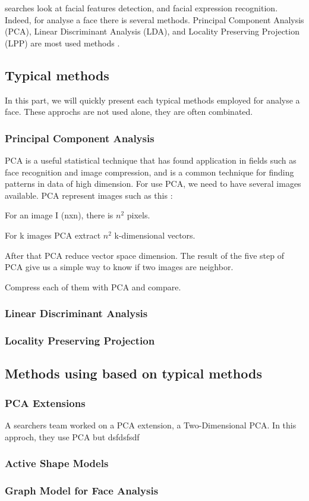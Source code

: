 searches look at facial features detection, and facial expression recognition. Indeed, for analyse a face there is several methods. Principal Component Analysis (PCA), Linear Discriminant Analysis (LDA), and Locality Preserving Projection (LPP) are most used methods \cite{UsingGraphModelforFaceAnalysis}.

\subsection{Typical methods}
	In this part, we will quickly present each typical methods employed for analyse a face\cite{UsingGraphModelforFaceAnalysis}. These approchs are not used alone, they are often combinated.\\
	
	
	\subsubsection{Principal Component Analysis} \leavevmode\par
	PCA is a useful statistical technique that has found application in fields such as face recognition and image compression, and is a common technique for finding patterns in data of high dimension. For use PCA, we need to have several images available. PCA represent images such as this :
		
		For an image I (nxn), there is $n^{2}$ pixels.
		
		For k images PCA extract $n^{2}$ k-dimensional vectors.
		
		After that PCA reduce vector space dimension. The result of the five step of PCA give us a simple way to know if two images are neighbor.

		Compress each of them with PCA and compare.
		
	\subsubsection{Linear Discriminant Analysis}

	\subsubsection{Locality Preserving Projection}

\subsection{Methods using based on typical methods}
	\subsubsection{PCA Extensions\\}
		A searchers team worked on a PCA extension, a Two-Dimensional PCA\cite{Two-Dimensional-PCA}. In this approch, they use PCA but dsfdsfsdf
	
	\subsubsection{Active Shape Models}
		
	\subsubsection{Graph Model for Face Analysis}


